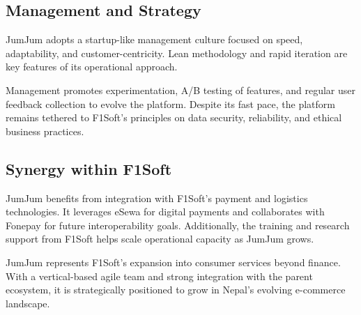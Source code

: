 \documentclass[12pt, a4paper]{report}
\begin{document}
\vspace{18pt}
\subsection{Management and Strategy}

JumJum adopts a startup-like management culture focused on speed, adaptability, and customer-centricity. Lean methodology and rapid iteration are key features of its operational approach. 

Management promotes experimentation, A/B testing of features, and regular user feedback collection to evolve the platform. Despite its fast pace, the platform remains tethered to F1Soft’s principles on data security, reliability, and ethical business practices.

\vspace{18pt}
\subsection{Synergy within F1Soft}

JumJum benefits from integration with F1Soft’s payment and logistics technologies. It leverages eSewa for digital payments and collaborates with Fonepay for future interoperability goals. Additionally, the training and research support from F1Soft helps scale operational capacity as JumJum grows.

\bigskip
JumJum represents F1Soft’s expansion into consumer services beyond finance. With a vertical-based agile team and strong integration with the parent ecosystem, it is strategically positioned to grow in Nepal’s evolving e-commerce landscape.
\end{document}
